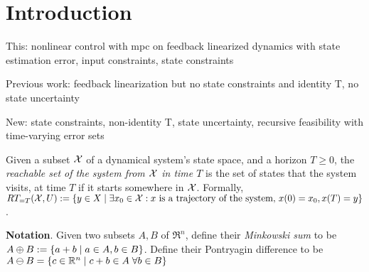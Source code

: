 \section{Introduction}
\label{sec:intro}



This:
nonlinear control with mpc on feedback linearized dynamics with state estimation error, input constraints, state constraints

Previous work: feedback linearization but no state constraints and identity T, no state uncertainty

New:	
state constraints, 
non-identity T,
state uncertainty,
recursive feasibility with time-varying error sets

Given a subset $\mathcal{X}$ of a dynamical system's state space, and a horizon $T \geq 0$, the \emph{reachable set of the system from $\mathcal{X}$ in time $T$} is the set of states that the system visits, at time $T$ if it starts somewhere in $\mathcal{X}$.
Formally, $RT_{=T}(\mathcal{X},U) := \{y \in X \;|\; \exists x_0 \in \mathcal{X}: x \text{ is a trajectory of the system, }x(0)=x_0, x(T)=y\}$.

\textbf{Notation}.
Given two subsets $A,B$ of $\Re^n$, define their \textit{Minkowski sum} to be $A\oplus B := \{a+b \;|\; a\in A, b\in B\}$.
Define their Pontryagin difference to be $A\ominus B = \{c \in \mathbb{R}^n \;|\; c+b \in A\; \forall b \in B\}$